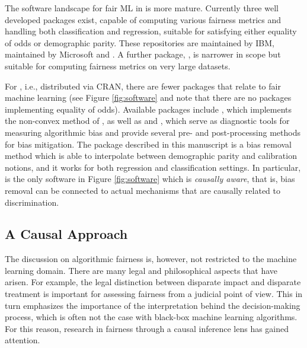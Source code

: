 \documentclass[
  nojss]{jss}
\begin{document}
The software landscape for fair ML in  is more mature.
Currently three well developed packages exist, capable of computing
various fairness metrics and handling both classification and
regression, suitable for satisfying either equality of odds or
demographic parity. These repositories are 
\citep{aif360-oct-2018} maintained by IBM, 
\citep{bird2020fairlearn} maintained by Microsoft and . A
further package, , is narrower in scope but
suitable for computing fairness metrics on very large datasets.

For , i.e., distributed via CRAN, there are fewer packages
that relate to fair machine learning (see Figure \ref{fig:software} and
note that there are no packages implementing equality of odds).
Available packages include  \citep{scutari2021fairml}, which
implements the non-convex method of \cite{komiyama2018nonconvex}, as
well as  \citep{kozodoi2021fairness} and 
\citep{wisniewski2021fairmodels}, which serve as diagnostic tools for
measuring algorithmic bias and provide several pre- and post-processing
methods for bias mitigation. The  package described in
this manuscript is a bias removal method which is able to interpolate
between demographic parity and calibration notions, and it works for
both regression and classification settings. In particular,
 is the only software in Figure \ref{fig:software} which
is \emph{causally aware}, that is, bias removal can be connected to
actual mechanisms that are causally related to discrimination.

\hypertarget{a-causal-approach}{%
\subsection{A Causal Approach}\label{a-causal-approach}}

The discussion on algorithmic fairness is, however, not restricted to
the machine learning domain. There are many legal and philosophical
aspects that have arisen. For example, the legal distinction between
disparate impact and disparate treatment \citep{mcginley2011ricci} is
important for assessing fairness from a judicial point of view. This in
turn emphasizes the importance of the interpretation behind the
decision-making process, which is often not the case with black-box
machine learning algorithms. For this reason, research in fairness
through a causal inference lens has gained attention.
\end{document}
